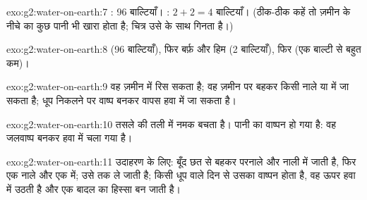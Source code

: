 \begin{solution}{exo:g2:water-on-earth:7}
: 96 बाल्टियाँ। : $2 + 2 = 4$ बाल्टियाँ।
(ठीक-ठीक कहें तो ज़मीन के नीचे का कुछ पानी भी खारा होता है; चित्र उसे  के साथ गिनता है।)
\end{solution}

\begin{solution}{exo:g2:water-on-earth:8}
 (96 बाल्टियाँ), फिर बर्फ़ और हिम (2 बाल्टियाँ), फिर  (एक
बाल्टी से बहुत कम)।
\end{solution}

\begin{solution}{exo:g2:water-on-earth:9}
वह ज़मीन में रिस सकता है; वह ज़मीन पर बहकर किसी नाले या  में जा सकता
है; धूप निकलने पर वाष्प बनकर वापस हवा में जा सकता है।
\end{solution}

\begin{solution}{exo:g2:water-on-earth:10}
तसले की तली में नमक बचता है। पानी का वाष्पन हो गया है: वह जलवाष्प बनकर
हवा में चला गया है।
\end{solution}

\begin{solution}{exo:g2:water-on-earth:11}
उदाहरण के लिए: बूँद छत से बहकर परनाले और नाली में जाती है, फिर एक नाले और
एक  में;  उसे  तक ले जाती है; किसी धूप वाले दिन  से
उसका वाष्पन होता है, वह ऊपर हवा में उठती है और एक बादल का हिस्सा बन जाती
है।
\end{solution}
